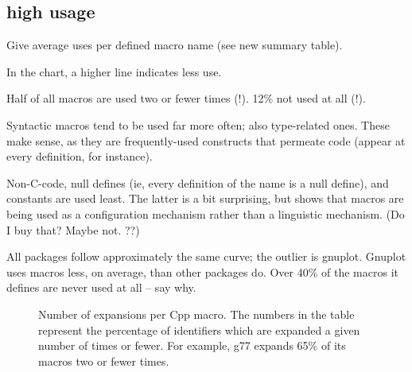 \documentclass[10pt]{article}
\newcommand{\pkg}[1]{\textsf{#1}}
\begin{document}
\subsection{high usage}

        Give average uses per defined macro name (see new summary table).

        In the chart, a higher line indicates less use.

        Half of all macros are used two or fewer times (!).  12\% not used
          at all (!).

        Syntactic macros tend to be used far more often; also type-related
          ones.  These make sense, as they are frequently-used constructs
          that permeate code (appear at every definition, for instance).

        Non-C-code, null defines (ie, every definition of the name is a
          null define), and constants are used least.  The latter is a bit
          surprising, but shows that macros are being used as a
          configuration mechanism rather than a linguistic mechanism.  (Do
          I buy that?  Maybe not. ??)

        All packages follow approximately the same curve; the outlier is
          gnuplot.  Gnuplot uses macros less, on average, than other packages
          do.  Over 40\% of the macros it defines are never used at all --
          say why.



\begin{figure}
\centerline{}
\caption{Number of expansions per Cpp macro.  The numbers in the
  table represent the percentage of identifiers which are expanded a given
  number of times or fewer.  For example, \pkg{g77} expands 65\% of its
  macros two or fewer times.}
\label{fig:freq-use-cat}
\end{figure}
\end{document}
